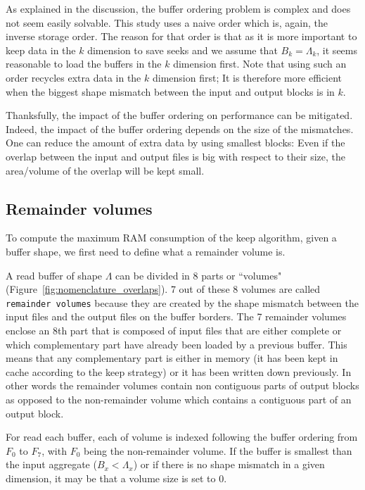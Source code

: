 \documentclass[sigconf, nonacm]{acmart}
\begin{document}
As explained in the discussion, the buffer ordering problem is complex and does
not seem easily solvable.
This study uses a naive order which is, again, the inverse storage order.
The reason for that order is that as it is more important to keep data in the
$k$ dimension to save seeks and we assume that $B_k=\Lambda_k$, it seems
reasonable to load the buffers in the $k$ dimension first.
Note that using such
an order recycles extra data in the $k$ dimension first; It is therefore
more efficient when the biggest shape mismatch between the input and output
blocks is in $k$.

Thanksfully, the impact of the buffer ordering on performance can be
mitigated. Indeed, the impact of the buffer ordering depends on the size of the
mismatches. One can reduce the amount of extra data by using smallest blocks: Even
if the overlap between the input and output files is big with respect to their
size, the area/volume of the overlap will be kept small.

\subsection{Remainder volumes}
To compute the maximum RAM consumption of the keep algorithm, given a
buffer shape, we first need to define what a remainder volume is.

A read buffer of shape $\Lambda$ can be divided in
8 parts or ``volumes" (Figure~\ref{fig:nomenclature_overlaps}).
7 out of these 8 volumes are called \texttt{remainder volumes} because
they are created by the shape mismatch between the input files and the output files on
the buffer borders.
The 7 remainder volumes enclose an 8th part that is composed of
input files that are either complete or which complementary part have already
been loaded by a previous buffer. This means that any complementary part is either
in memory (it has been kept in cache according to the keep strategy) or it has
been written down previously.
In other words the remainder volumes contain non contiguous parts of output blocks
as opposed to the non-remainder volume which contains a contiguous part of
an output block.

For read each buffer, each of volume
is indexed following the buffer ordering from $F_0$ to $F_7$, with $F_0$ being the
non-remainder volume. If the buffer is smallest than the input aggregate
($B_x<\Lambda_x$) or if there is no shape mismatch in a given dimension,
it may be that a volume size is set to 0.
\end{document}
